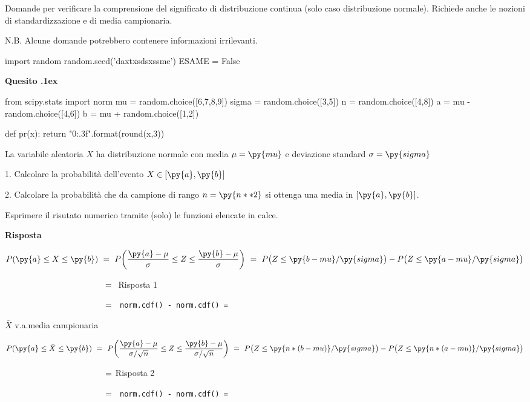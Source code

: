 \documentclass[11pt,twoside,a4paper]{article}
\newcounter{quesito}
\newenvironment{question}{\addtocounter{quesito}{1}\bigskip\bigskip\par\textbf{Quesito \thequesito.\kern1ex}}{\vspace{\parskip}}
\newenvironment{answer}{\par\textbf{Risposta\quad}}{\vspace{\parskip}}
\begin{document}
\colorbox{blue!10}{\begin{minipage}{\textwidth}
Domande per verificare la comprensione del significato di distribuzione continua (solo caso distribuzione normale). Richiede anche le nozioni di standardizzazione e di media campionaria.\medskip

N.B. Alcune domande potrebbero contenere informazioni irrilevanti.
\end{minipage}}
\bigskip\bigskip


\begin{pycode}
import random
random.seed('daxtxsdsxssme')
ESAME = False
\end{pycode}

\begin{question} %
\begin{pycode}
from scipy.stats import norm
mu = random.choice([6,7,8,9])
sigma = random.choice([3,5])
n = random.choice([4,8])
a = mu - random.choice([4,6])
b = mu + random.choice([1,2])

def pr(x):
    return "{0:.3f}".format(round(x,3))
\end{pycode}
La variabile aleatoria $X$ ha distribuzione normale con media $\mu=\py{mu}$ e deviazione standard $\sigma=\py{sigma}$ 

1. Calcolare la probabilità dell'evento $X\in [\py{a},\py{b}]$ 

2. Calcolare la probabilità che da campione di rango $n=\py{n**2}$ si ottenga una media in $[\py{a},\py{b}]$. 

Esprimere il risutato numerico tramite (solo) le funzioni elencate in calce.
\begin{answer}

$P(\py{a}\le X\le\py{b})\ =\ P\bigg(\dfrac{\py{a}-\mu}{\sigma}\le Z\le\dfrac{\py{b}-\mu}{\sigma}\bigg)\ =\  P\big(Z\le\py{b-mu}/\py{sigma}\big) -  P\big(Z\le\py{a-mu}/\py{sigma}\big)$ 

$\phantom{P(\py{a}\le X\le\py{b})}\ =\ ${ \hfill Risposta 1}

$\phantom{P(\py{a}\le X\le\py{b})}\ =\ ${\tt\ norm.cdf() -  norm.cdf() = }

$\bar X$ v.a.\@ media campionaria

$P(\py{a}\le\bar X\le\py{b})\ =\ P\bigg(\dfrac{\py{a}-\mu}{\sigma/\sqrt{n}}\le Z\le\dfrac{\py{b}-\mu}{\sigma/\sqrt{n}}\bigg)\ =\  P\big(Z\le\py{n*(b-mu)}/\py{sigma}\big) -  P\big(Z\le\py{n*(a-mu)}/\py{sigma}\big)$

$\phantom{P(\py{a}\le\bar X\le\py{b})}\ =\ ${\hfill Risposta 2}

$\phantom{P(\py{a}\le\bar X\le\py{b})}\ =\ ${\tt\ norm.cdf() -  norm.cdf()  = }

\end{answer}
\end{question}
\end{document}
